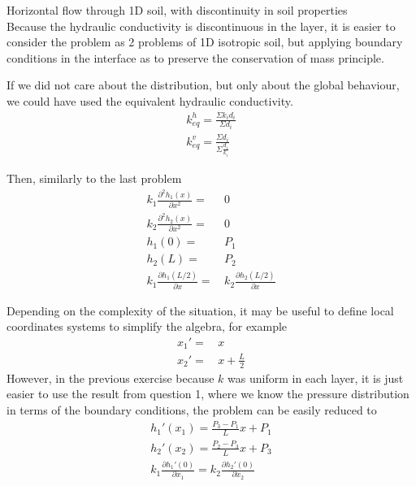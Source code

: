 \documentclass[a4paper, 11pt,article,oneside]{memoir}%
\begin{document}
\begin{exbox}{}{Horizontal flow through 1D soil, with discontinuity in soil properties}\\
Because the hydraulic conductivity is discontinuous in the layer, it is easier to consider the problem as 2 problems of 1D isotropic soil, but applying boundary conditions in the interface as to preserve the conservation of mass principle.
\begin{note}
If we did not care about the distribution, but only about the global behaviour, we could have used the equivalent hydraulic conductivity.
\begin{gather*}
k_{eq}^h=\frac{\Sigma k_id_i}{\Sigma d_i}\\
k_{eq}^v=\frac{\Sigma d_i}{\Sigma \frac{d_i}{k_i}}\
\end{gather*}
\end{note}
Then, similarly to the last problem 
\begin{align*}
k_1\frac{\partial^2 h_1(x)}{\partial x^2}=&\,0 \\
k_2\frac{\partial^2 h_2(x)}{\partial x^2}=&\,0 \\
h_1(0)=&\,P_1\\
h_2(L)=&\,P_2 \\
k_1\frac{\partial h_1(L/2)}{\partial x}=&\,k_2\frac{\partial h_2(L/2)}{\partial x}
\end{align*}
\begin{note}
Depending on the complexity of the situation, it may be useful to define local coordinates systems to simplify the algebra, for example
\begin{align*}
x_1'=&\,x\\
x_2'=&\,x+\frac{L}{2}
\end{align*}
However, in the previous exercise because $k$ was uniform in each layer, it is just easier to use the result from question 1, where we know the pressure distribution in terms of  the boundary conditions, the problem can be easily reduced to 
\begin{align*}
h_1'(x_1)=\frac{P_3-P_1}{L}x+P_1\\
h_2'(x_2)=\frac{P_2-P_3}{L}x+P_3\\
k_1\frac{\partial h_1'(0)}{\partial x_1}=k_2\frac{\partial h_2'(0)}{\partial x_2}
\end{align*}
\end{note}
\end{exbox}
\end{document}
